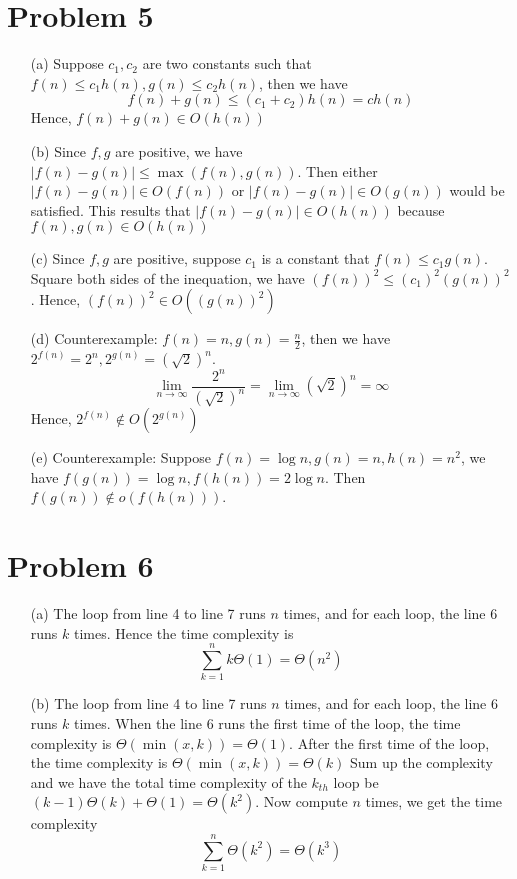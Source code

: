 \documentclass[12pt,a4paper]{article}
\begin{document}
\section*{Problem 5}

\begin{enumerate}
    \item[(a)] 
        Suppose $c_1, c_2$ are two constants such that $f(n)\leq c_1h(n), g(n)\leq c_2h(n)$, then we have
        \[
            f(n) + g(n) \leq (c_1 + c_2)h(n) = ch(n)
        \]
        Hence, $f(n) + g(n) \in O(h(n))$
    \item[(b)]
        Since $f, g$ are positive, we have $\left\lvert f(n) - g(n) \right\rvert \leq \max(f(n), g(n))$. Then either $\left\lvert f(n) - g(n) \right\rvert \in O(f(n))$ or $\left\lvert f(n) - g(n) \right\rvert \in O(g(n))$ would be satisfied.
        This results that $\left\lvert f(n) - g(n) \right\rvert \in O(h(n))$ because $f(n), g(n) \in O(h(n))$
    \item[(c)]
        Since $f, g$ are positive, suppose $c_1$ is a constant that $f(n)\leq c_1g(n)$. Square both sides of the inequation, we have $(f(n))^2 \leq (c_1)^2(g(n))^2$.
        Hence, $(f(n))^2 \in O((g(n))^2)$
    \item[(d)]
        Counterexample: $f(n) = n, g(n) = \frac{n}{2}$, then we have $2^{f(n)} = 2^{n}, 2^{g(n)} = (\sqrt{2})^{n}$.
        \[
            \lim_{n\to\infty} \frac{2^{n}}{(\sqrt{2})^n} = \lim_{n\to\infty} (\sqrt{2})^n = \infty
        \]
        Hence, $2^{f(n)} \notin O(2^{g(n)})$
    \item[(e)] 
        Counterexample: Suppose $f(n) = \log n, g(n) = n, h(n) = n^{2}$, we have $f(g(n)) = \log n, f(h(n)) = 2\log n$. Then $f(g(n)) \notin o(f(h(n)))$. 
\end{enumerate}

\section*{Problem 6}

\begin{enumerate}
    \item[(a)]
        The loop from line 4 to line 7 runs $n$ times, and for each loop, the line 6 runs $k$ times. 
        Hence the time complexity is 
        \[
            \sum_{k=1}^{n} k\Theta(1) = \Theta(n^2)
        \]
    \item[(b)] 
        The loop from line 4 to line 7 runs $n$ times, and for each loop, the line 6 runs $k$ times.
        When the line 6 runs the first time of the loop, the time complexity is $\Theta(\min(x, k)) = \Theta(1)$.
        After the first time of the loop, the time complexity is $\Theta(\min(x, k)) = \Theta(k)$
        Sum up the complexity and we have the total time complexity of the $k_{th}$ loop be $(k-1)\Theta(k) + \Theta(1) = \Theta(k^2)$.
        Now compute $n$ times, we get the time complexity
        \[
            \sum_{k=1}^{n} \Theta(k^2) = \Theta(k^3)
        \]
\end{enumerate}
\end{document}
